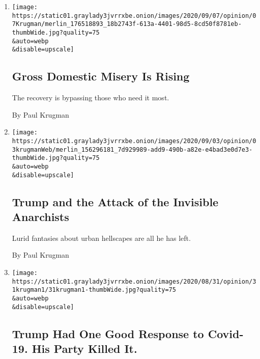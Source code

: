 \begin{enumerate}
\def\labelenumi{\arabic{enumi}.}
\item
  \href{/2020/09/07/opinion/trump-economy-jobs.html}{}

  \texttt{[image: https://static01.graylady3jvrrxbe.onion/images/2020/09/07/opinion/07Krugman/merlin\_176518893\_18b2743f-613a-4401-98d5-8cd50f8781eb-thumbWide.jpg?quality=75\\\&auto=webp\\\&disable=upscale]}

  \hypertarget{gross-domestic-misery-is-rising}{%
  \subsection{Gross Domestic Misery Is
  Rising}\label{gross-domestic-misery-is-rising}}

  The recovery is bypassing those who need it most.

  By Paul Krugman
\item
  \href{/2020/09/03/opinion/trump-democrats-cities.html}{}

  \texttt{[image: https://static01.graylady3jvrrxbe.onion/images/2020/09/03/opinion/03krugmanWeb/merlin\_156296181\_7d929989-add9-490b-a82e-e4bad3e0d7e3-thumbWide.jpg?quality=75\\\&auto=webp\\\&disable=upscale]}

  \hypertarget{trump-and-the-attack-of-the-invisible-anarchists}{%
  \subsection{Trump and the Attack of the Invisible
  Anarchists}\label{trump-and-the-attack-of-the-invisible-anarchists}}

  Lurid fantasies about urban hellscapes are all he has left.

  By Paul Krugman
\item
  \href{/2020/08/31/opinion/trump-coronavirus-economy.html}{}

  \texttt{[image: https://static01.graylady3jvrrxbe.onion/images/2020/08/31/opinion/31krugman1/31krugman1-thumbWide.jpg?quality=75\\\&auto=webp\\\&disable=upscale]}

  \hypertarget{trump-had-one-good-response-to-covid-19-his-party-killed-it}{%
  \subsection{Trump Had One Good Response to Covid-19. His Party Killed
  It.}\label{trump-had-one-good-response-to-covid-19-his-party-killed-it}}


\end{enumerate}
